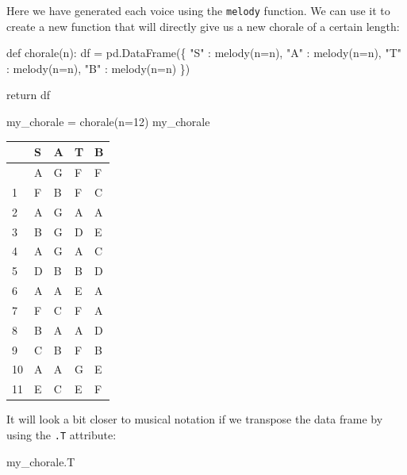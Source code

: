 \documentclass[
  a4paperpaper,
  ,captions=tableheading
]{scrbook}
\newenvironment{Shaded}{\begin{snugshade}}{\end{snugshade}}
\newcommand{\ControlFlowTok}[1]{\textcolor[rgb]{0.00,0.23,0.31}{#1}}
\newcommand{\DecValTok}[1]{\textcolor[rgb]{0.68,0.00,0.00}{#1}}
\newcommand{\KeywordTok}[1]{\textcolor[rgb]{0.00,0.23,0.31}{#1}}
\newcommand{\NormalTok}[1]{\textcolor[rgb]{0.00,0.23,0.31}{#1}}
\newcommand{\OperatorTok}[1]{\textcolor[rgb]{0.37,0.37,0.37}{#1}}
\newcommand{\StringTok}[1]{\textcolor[rgb]{0.13,0.47,0.30}{#1}}
\begin{document}
Here we have generated each voice using the \texttt{melody} function. We
can use it to create a new function that will directly give us a new
chorale of a certain length:

\begin{Shaded}
\begin{Highlighting}[]
\KeywordTok{def}\NormalTok{ chorale(n):}
\NormalTok{    df }\OperatorTok{=}\NormalTok{ pd.DataFrame(\{}
        \StringTok{"S"}\NormalTok{ : melody(n}\OperatorTok{=}\NormalTok{n),}
        \StringTok{"A"}\NormalTok{ : melody(n}\OperatorTok{=}\NormalTok{n),}
        \StringTok{"T"}\NormalTok{ : melody(n}\OperatorTok{=}\NormalTok{n),}
        \StringTok{"B"}\NormalTok{ : melody(n}\OperatorTok{=}\NormalTok{n)}
\NormalTok{    \})}

    \ControlFlowTok{return}\NormalTok{ df}
\end{Highlighting}
\end{Shaded}

\begin{Shaded}
\begin{Highlighting}[]
\NormalTok{my\_chorale }\OperatorTok{=}\NormalTok{ chorale(n}\OperatorTok{=}\DecValTok{12}\NormalTok{)}
\NormalTok{my\_chorale}
\end{Highlighting}
\end{Shaded}

\begin{longtable}[]{@{}lllll@{}}
\toprule\noalign{}
& S & A & T & B \\
\midrule\noalign{}
\endhead
\bottomrule\noalign{}
\endlastfoot
0 & A & G & F & F \\
1 & F & B & F & C \\
2 & A & G & A & A \\
3 & B & G & D & E \\
4 & A & G & A & C \\
5 & D & B & B & D \\
6 & A & A & E & A \\
7 & F & C & F & A \\
8 & B & A & A & D \\
9 & C & B & F & B \\
10 & A & A & G & E \\
11 & E & C & E & F \\
\end{longtable}

It will look a bit closer to musical notation if we transpose the data
frame by using the \texttt{.T} attribute:

\begin{Shaded}
\begin{Highlighting}[]
\NormalTok{my\_chorale.T}
\end{Highlighting}
\end{Shaded}
\end{document}
